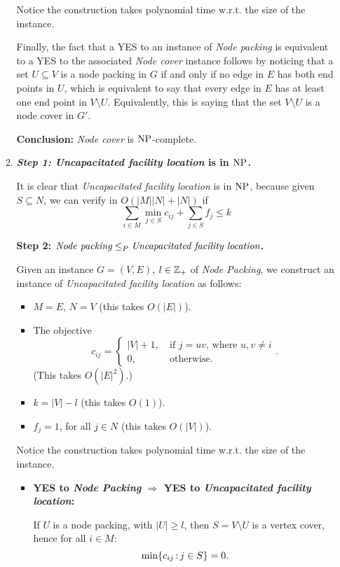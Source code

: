 \begin{enumerate}
\begin{enumerate}
	Notice the construction takes polynomial time w.r.t. the size of the instance.
	
	Finally, the fact that a YES to an instance of {\em Node packing} is equivalent to a YES to the associated {\em Node cover} instance follows by noticing that a set $U\subseteq V$ is a node packing in $G$ if and only if no edge in $E$ has both end points in $U$, which is equivalent to say that every edge in $E$ has at least one end point in $V\setminus U$. Equivalently, this is saying that the set $V\setminus U$ is a node cover in $G'$.
		
{\bf Conclusion:}	{\em Node cover} is $\NP$-complete.

\item {\bf {\em Step 1: {\em Uncapacitated facility location}} is in $\NP$.} 
	
	It is clear that {\em Uncapacitated facility location} is in $\NP$, because given $S\subseteq N$, we can verify in $O(|M||N|+|N|)$ if
	$$\sum_{i\in M}\min_{j\in S} c_{ij} + \sum_{j\in S}f_j \leq k$$
	
 {\bf Step 2: $\text{{\em Node packing}}\leq_P\text{{\em Uncapacitated facility location}}$.} 
	
	Given an instance $G=(V,E)$, $l\in\Z_+$ of {\em Node Packing}, we construct an instance of {\em Uncapacitated facility location} as follows:
	\begin{itemize}
		\item $M=E$, $N=V$ (this takes $O(|E|)$).
		\item The objective
		$$c_{ij}=\begin{cases}|V|+1,\ & \text{if $j=uv$, where $u,v\neq i$}\\ 0,\ & \text{otherwise.}\end{cases}.$$
	  (This takes $O(|E|^2)$.) 	
		\item $k=|V|-l$ (this takes $O(1)$).
		\item $f_j=1$, for all $j\in N$ (this takes $O(|V|)$).
	\end{itemize}
	
	Notice the construction takes polynomial time w.r.t. the size of the instance.
	
\begin{itemize}
	\item {\bf YES to {\em Node Packing} $\Rightarrow$ YES to {\em Uncapacitated facility location}:}
	
	If $U$ is a node packing, with $|U|\geq l$, then $S=V\setminus U$ is a vertex cover, hence for all $i\in M$:
	$$\min\{c_{ij}\tq j\in S\}=0.$$
	

\end{itemize}
\end{enumerate}
\end{enumerate}
